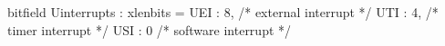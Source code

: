 bitfield Uinterrupts : xlenbits = {
  UEI : 8,  /* external interrupt */
  UTI : 4,  /* timer interrupt    */
  USI : 0   /* software interrupt */
}
